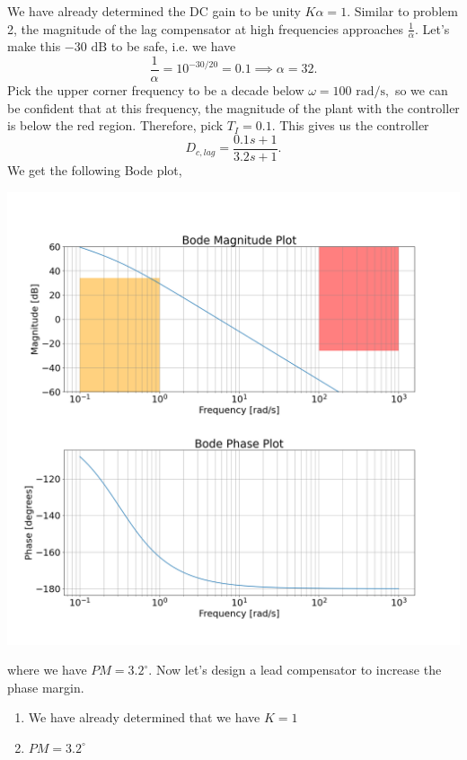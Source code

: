 \documentclass{article}
\begin{document}
\begin{enumerate}[label=\textbf{4.\arabic*}]
\begin{enumerate}[label=(\alph*)]
    We have already determined the DC gain to be unity $K\alpha = 1.$ Similar to problem 2, the magnitude of the lag compensator at high frequencies approaches $\frac{1}{\alpha}.$ Let's make this $-30\text{ dB}$ to be safe, i.e. we have 
    \begin{equation}
        \frac{1}{\alpha} = 10^{-30/20} = 0.1 \implies \alpha = 32.
    \end{equation}
    Pick the upper corner frequency to be a decade below $\omega = 100\text{ rad/s},$ so we can be confident that at this frequency, the magnitude of the plant with the controller is below the red region. Therefore, pick $T_I = 0.1.$ This gives us the controller 
    \begin{equation}
        D_{c,lag} = \frac{0.1s+1}{3.2s+1}.
    \end{equation}
    We get the following Bode plot,
    \begin{center}
        \includegraphics[width=\linewidth]{A4_imgs/q5_bode_d_1.png}
    \end{center}
    where we have $PM = 3.2^\circ.$ Now let's design a lead compensator to increase the phase margin.
    \begin{enumerate}[label=(\arabic*)]
        \item We have already determined that we have $K=1$
        \item $PM=3.2^\circ$

\end{enumerate}
\end{enumerate}
\end{enumerate}
\end{document}
